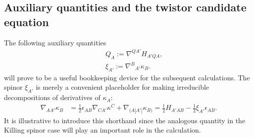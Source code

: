 \documentclass[10pt,a4paper]{article}
\theoremstyle{plain}
\begin{document}
\subsection{Auxiliary quantities and the twistor candidate equation}
  
The following auxiliary quantities
\begin{subequations}\label{def_twistor_aux_quants}
  \begin{eqnarray}
      && Q_{A}  := \nabla^{QA'}H_{A'QA}, \label{def_Q_twistor} \\
      && \xi_{A'} := \nabla^B{}_{A'}\kappa_B. \label{def_xi_twistor}
  \end{eqnarray}
\end{subequations}
will prove to be a useful bookkeeping device for the subsequent
calculations.
  The spinor $\xi_{A'}$ is merely a convenient
  placeholder for making irreducible decompositions of derivatives of
  $\kappa_A$:
  \begin{align}\label{decomp_Der_kappa}
    \nabla_{AA'}\kappa _{B} & = \tfrac{1}{2} \epsilon _{AB}
    \nabla_{CA'}\kappa ^{C} + \nabla_{(A|A'|}\kappa _{B)} = \tfrac{1}{2} H_{A'AB} - \tfrac{1}{2} \xi _{A'} \epsilon_{AB}.
  \end{align}
It is illustrative to introduce this
  shorthand since the analogous quantity in the Killing spinor case
  will play an important role in the calculation.

  \medskip
  
\end{document}
